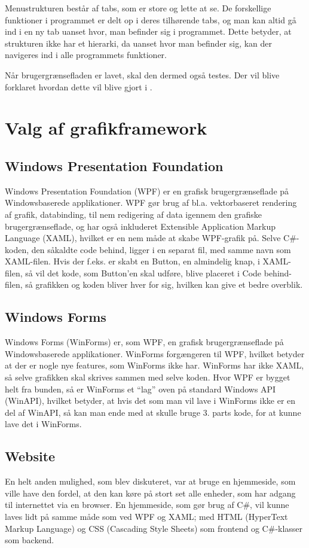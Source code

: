 Menustrukturen består af tabs, som er store og lette at se.
De forskellige funktioner i programmet er delt op i deres tilhørende tabs, og man kan altid gå ind i en ny tab uanset hvor, man befinder sig i programmet. 
Dette betyder, at strukturen ikke har et hierarki, da uanset hvor man befinder sig, kan der navigeres ind i alle programmets funktioner. 

Når brugergrænsefladen er lavet, skal den dermed også testes. Der vil blive forklaret hvordan dette vil blive gjort i .
\section{Valg af grafikframework} 

\subsection{Windows Presentation Foundation}
Windows Presentation Foundation (WPF) er en grafisk brugergrænseflade på Windowsbaserede applikationer. 
WPF gør brug af  bl.a. vektorbaseret rendering af grafik, databinding, til nem redigering af data igennem den grafiske brugergrænseflade, og har også inkluderet Extensible Application Markup Language (XAML), hvilket er en nem måde at skabe WPF-grafik på. 
Selve C\#-koden, den såkaldte code behind, ligger i en separat fil, med samme navn som XAML-filen. 
Hvis der f.eks. er skabt en Button, en almindelig knap, i XAML-filen, så vil det kode, som Button'en skal udføre, blive placeret i Code behind-filen, så grafikken og koden bliver hver for sig, hvilken kan give et bedre overblik.\citep{wpf} 

\subsection{Windows Forms}
Windows Forms (WinForms) er, som WPF, en grafisk brugergrænseflade på Windowsbaserede applikationer. WinForms forgængeren til WPF, hvilket betyder at der er nogle nye features, som WinForms ikke har.
WinForms har ikke XAML, så selve grafikken skal skrives sammen med selve koden. 
Hvor WPF er bygget helt fra bunden, så er WinForms et ``lag'' oven på standard Windows API (WinAPI), hvilket betyder, at hvis det som man vil lave i WinForms ikke er en del af WinAPI, så kan man ende med at skulle bruge 3. parts kode, for at kunne lave det i WinForms.\citep{winforms2}

\subsection{Website}
En helt anden mulighed, som blev diskuteret, var at bruge en hjemmeside, som ville have den fordel, at den kan køre på stort set alle enheder, som har adgang til internettet via en browser. 
En hjemmeside, som gør brug af C\#, vil kunne laves lidt på samme måde som ved WPF og XAML; med HTML (HyperText Markup Language) og CSS (Cascading Style Sheets) som frontend og C\#-klasser som backend. 

